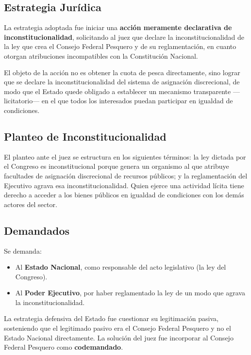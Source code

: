 \documentclass[12pt,oneside]{book}
\begin{document}
\subsection{Estrategia Jurídica}

La estrategia adoptada fue iniciar una \textbf{acción meramente declarativa de inconstitucionalidad}, solicitando al juez que declare la inconstitucionalidad de la ley que crea el Consejo Federal Pesquero y de su reglamentación, en cuanto otorgan atribuciones incompatibles con la Constitución Nacional.

\begin{important}
El objeto de la acción no es obtener la cuota de pesca directamente, sino lograr que se declare la inconstitucionalidad del sistema de asignación discrecional, de modo que el Estado quede obligado a establecer un mecanismo transparente —licitatorio— en el que todos los interesados puedan participar en igualdad de condiciones.
\end{important}

\subsection{Planteo de Inconstitucionalidad}

El planteo ante el juez se estructura en los siguientes términos: la ley dictada por el Congreso es inconstitucional porque genera un organismo al que atribuye facultades de asignación discrecional de recursos públicos; y la reglamentación del Ejecutivo agrava esa inconstitucionalidad. Quien ejerce una actividad lícita tiene derecho a acceder a los bienes públicos en igualdad de condiciones con los demás actores del sector.

\subsection{Demandados}

Se demanda:
\begin{itemize}
    \item Al \textbf{Estado Nacional}, como responsable del acto legislativo (la ley del Congreso).
    \item Al \textbf{Poder Ejecutivo}, por haber reglamentado la ley de un modo que agrava la inconstitucionalidad.
\end{itemize}

La estrategia defensiva del Estado fue cuestionar su legitimación pasiva, sosteniendo que el legitimado pasivo era el Consejo Federal Pesquero y no el Estado Nacional directamente. La solución del juez fue incorporar al Consejo Federal Pesquero como \textbf{codemandado}.
\end{document}
